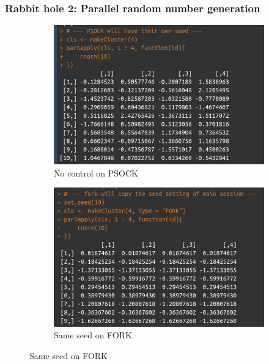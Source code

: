 \documentclass[aspectratio=169,xcolor={dvipsnames,table}]{beamer}
\begin{document}
\begin{frame}
  \frametitle{Rabbit hole 2: Parallel random number generation}
  \begin{figure}[htbp]
    \centering
    \begin{subfigure}[h]{0.45\textwidth}
      \includegraphics[width = \textwidth]{RNG_psock}
      \caption{No control on PSOCK}
    \end{subfigure}
        \begin{subfigure}[h]{0.45\textwidth}
      \includegraphics[width = \textwidth]{RNG_fork}
      \caption{Same seed on FORK}
    \end{subfigure}
  \end{figure}
\end{frame}
\end{document}
